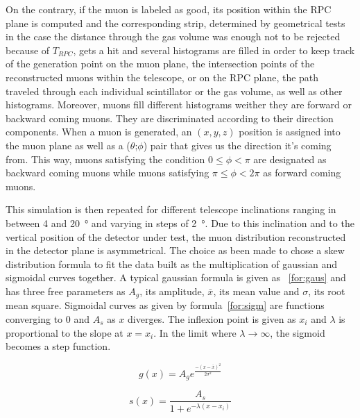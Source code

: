 			On the contrary, if the muon is labeled as good, its position within the RPC plane is computed and the corresponding strip, determined by geometrical tests in the case the distance through the gas volume was enough not to be rejected because of $T_{RPC}$, gets a hit and several histograms are filled in order to keep track of the generation point on the muon plane, the intersection points of the reconstructed muons within the telescope, or on the RPC plane, the path traveled through each individual scintillator or the gas volume, as well as other histograms. Moreover, muons fill different histograms weither they are forward or backward coming muons. They are discriminated according to their direction components. When a muon is generated, an $(x,y,z)$ position is assigned into the muon plane as well as a ($\theta$;$\phi$) pair that gives us the direction it's coming from. This way, muons satisfying the condition $0\leq\phi<\pi$ are designated as backward coming muons while muons satisfying $\pi\leq\phi<2\pi$ as forward coming muons.
			
			This simulation is then repeated for different telescope inclinations ranging in between 4 and \SI{20}{\degree} and varying in steps of \SI{2}{\degree}. Due to this inclination and to the vertical position of the detector under test, the muon distribution reconstructed in the detector plane is asymmetrical. The choice as been made to chose a skew distribution formula to fit the data built as the multiplication of gaussian and sigmoidal curves together. A typical gaussian formula is given as ~\ref{for:gaus} and has three free parameters as $A_g$, its amplitude, $\bar{x}$, its mean value and $\sigma$, its root mean square. Sigmoidal curves as given by formula~\ref{for:sigm} are functions converging to $0$ and $A_s$ as $x$ diverges. The inflexion point is given as $x_i$ and $\lambda$ is proportional to the slope at $x = x_i$. In the limit where $\lambda\longrightarrow\infty$, the sigmoid becomes a step function.
			
			\begin{center}
				\begin{equation}
				\label{for:gaus}
					g(x) = A_g e^{\frac{-(x-\bar{x})^2}{2\sigma^2}}
				\end{equation}
			\end{center}
			
			\begin{center}
				\begin{equation}
				\label{for:sigm}
					s(x) = \frac{A_s}{1+e^{-\lambda(x-x_i)}}
				\end{equation}
			\end{center}
			
